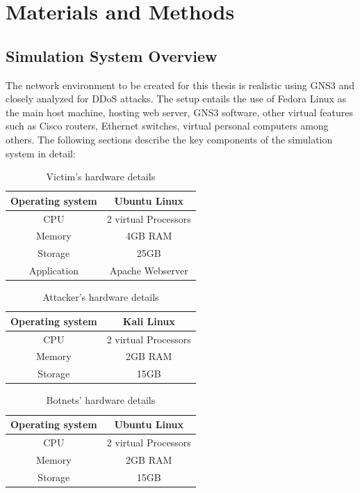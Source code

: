 \chapter{Materials and Methods}
\section{Simulation System Overview}
The network environment to be created for this thesis is realistic using GNS3 and closely analyzed for DDoS attacks. The setup entails the use of Fedora Linux as the main host machine, hosting web server, GNS3 software, other virtual features such as Cisco routers, Ethernet switches, virtual personal computers among others. The following sections describe the key components of the simulation system in detail:
\begin{table}[h]
    \centering
    \begin{tabular}{|c c|}
    \hline
        Operating system & Ubuntu Linux \\
    \hline
        CPU & 2 virtual Processors \\
    \hline
        Memory & 4GB RAM \\
    \hline
        Storage & 25GB \\
    \hline
        Application & Apache Webserver \\
    \hline
    \end{tabular}
    \caption{Victim's hardware details}
    \label{tab:my_label}
\end{table}
\begin{table}[h]
    \centering
    \begin{tabular}{|c c|}
    \hline
        Operating system & Kali Linux \\
    \hline
        CPU & 2 virtual Processors \\
    \hline
        Memory & 2GB RAM \\
    \hline
        Storage & 15GB \\
    \hline
    \end{tabular}
    \caption{Attacker's hardware details}
    \label{tab:my_label}
\end{table}
\begin{table}[h]
    \centering
    \begin{tabular}{|c c|}
    \hline
        Operating system & Ubuntu Linux \\
    \hline
        CPU & 2 virtual Processors \\
    \hline
        Memory & 2GB RAM \\
    \hline
        Storage & 15GB \\
    \hline
    \end{tabular}
    \caption{Botnets' hardware details}
    \label{tab:my_label}
\end{table}
\\
